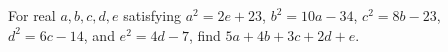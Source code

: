 For real $a,b,c,d,e$ satisfying $a^2=2e+23$, $b^2=10a-34$, $c^2=8b-23$, $d^2=6c-14$, and $e^2=4d-7$, find $5a+4b+3c+2d+e$.
